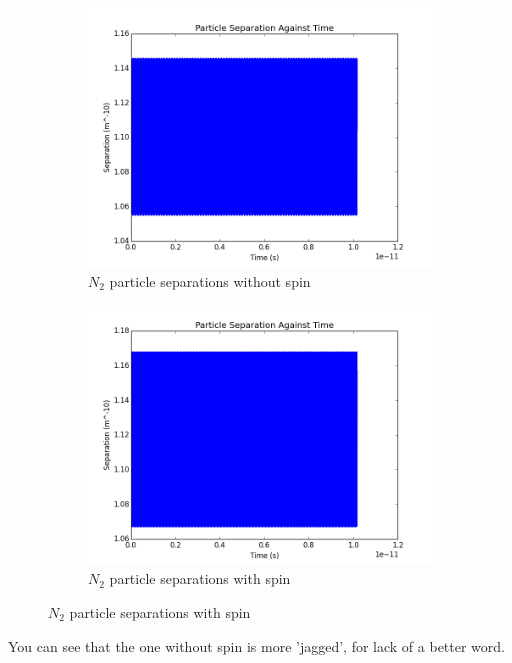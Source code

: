 \documentclass[12pt]{article}
\begin{document}
\begin{figure}[H]
		\centering
		\begin{subfigure}{0.45\textwidth}
			\includegraphics[width=\textwidth]{n2nospinlong}
			\caption*{$N_2$ particle separations without spin}
		\end{subfigure}
		\begin{subfigure}{0.45\textwidth}
			\includegraphics[width=\textwidth]{n2spinlong}
			\caption*{$N_2$ particle separations with spin}
		\end{subfigure}
	\end{figure}
	
You can see that the one without spin is more 'jagged', for lack of a better word.
	
\end{document}
